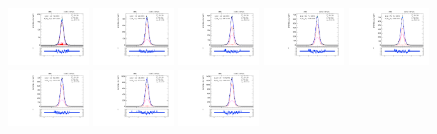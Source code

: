 \begin{figure}[htb]
\centering
\includegraphics[width=0.19\textwidth]{plots/Appendix_Recoil_Fits/ZmmData_PF_13TeV_2G_bkg/pfu2fit_0.pdf}
\includegraphics[width=0.19\textwidth]{plots/Appendix_Recoil_Fits/ZmmData_PF_13TeV_2G_bkg/pfu2fit_1.pdf}
\includegraphics[width=0.19\textwidth]{plots/Appendix_Recoil_Fits/ZmmData_PF_13TeV_2G_bkg/pfu2fit_2.pdf}
\includegraphics[width=0.19\textwidth]{plots/Appendix_Recoil_Fits/ZmmData_PF_13TeV_2G_bkg/pfu2fit_3.pdf}
\includegraphics[width=0.19\textwidth]{plots/Appendix_Recoil_Fits/ZmmData_PF_13TeV_2G_bkg/pfu2fit_4.pdf}
\includegraphics[width=0.19\textwidth]{plots/Appendix_Recoil_Fits/ZmmData_PF_13TeV_2G_bkg/pfu2fit_5.pdf}
\includegraphics[width=0.19\textwidth]{plots/Appendix_Recoil_Fits/ZmmData_PF_13TeV_2G_bkg/pfu2fit_6.pdf}
\includegraphics[width=0.19\textwidth]{plots/Appendix_Recoil_Fits/ZmmData_PF_13TeV_2G_bkg/pfu2fit_7.pdf}

\end{figure}
